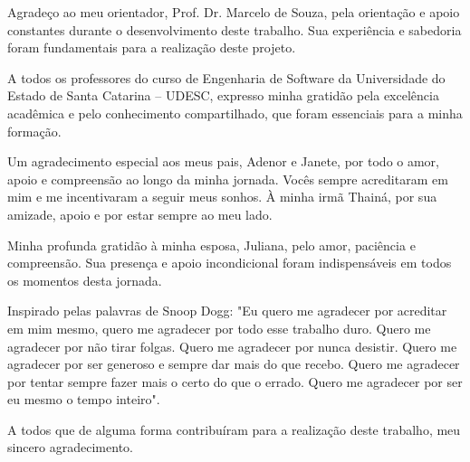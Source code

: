 \begin{agradecimentos}
	Agradeço ao meu orientador, Prof. Dr. Marcelo de Souza, pela orientação e apoio constantes durante o desenvolvimento deste trabalho. Sua experiência e sabedoria foram fundamentais para a realização deste projeto.

	A todos os professores do curso de Engenharia de Software da Universidade do Estado de Santa Catarina -- UDESC, expresso minha gratidão pela excelência acadêmica e pelo conhecimento compartilhado, que foram essenciais para a minha formação.

	Um agradecimento especial aos meus pais, Adenor e Janete, por todo o amor, apoio e compreensão ao longo da minha jornada. Vocês sempre acreditaram em mim e me incentivaram a seguir meus sonhos. À minha irmã Thainá, por sua amizade, apoio e por estar sempre ao meu lado.

	Minha profunda gratidão à minha esposa, Juliana, pelo amor, paciência e compreensão. Sua presença e apoio incondicional foram indispensáveis em todos os momentos desta jornada.

	Inspirado pelas palavras de Snoop Dogg: "Eu quero me agradecer por acreditar em mim mesmo, quero me agradecer por todo esse trabalho duro. Quero me agradecer por não tirar folgas. Quero me agradecer por nunca desistir. Quero me agradecer por ser generoso e sempre dar mais do que recebo. Quero me agradecer por tentar sempre fazer mais o certo do que o errado. Quero me agradecer por ser eu mesmo o tempo inteiro".

	A todos que de alguma forma contribuíram para a realização deste trabalho, meu sincero agradecimento.
\end{agradecimentos}
